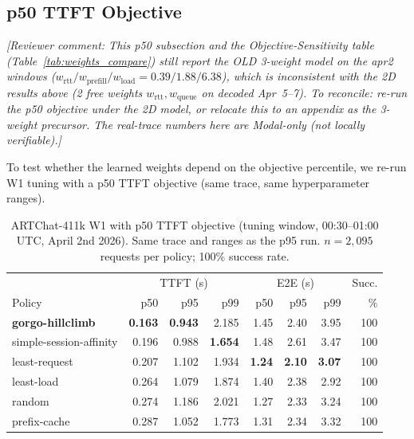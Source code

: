 \documentclass{article}
\newcommand{\cmt}[1]{\textcolor{green!45!black}{\textit{[Reviewer comment: #1]}}}
\begin{document}
\subsection{p50 TTFT Objective}
\label{sec:results:p50}

\cmt{This p50 subsection and the Objective-Sensitivity table
(Table~\ref{tab:weights_compare}) still report the OLD 3-weight model on the apr2
windows ($w_{\mathrm{rtt}}/w_{\mathrm{prefill}}/w_{\mathrm{load}}=0.39/1.88/6.38$),
which is inconsistent with the 2D results above (2 free weights
$w_{\mathrm{rtt}},w_{\mathrm{queue}}$ on decoded Apr~5--7). To reconcile: re-run
the p50 objective under the 2D model, or relocate this to an appendix as the
3-weight precursor. The real-trace numbers here are Modal-only (not locally
verifiable).}

To test whether the learned weights depend on the objective percentile, we
re-run W1 tuning with a p50 TTFT objective (same trace, same hyperparameter
ranges).

\begin{table}[t]
\centering
\small
\caption{ARTChat-411k W1 with p50 TTFT objective (tuning window, 00:30--01:00 UTC,
  April 2nd 2026). Same trace and ranges as the p95 run.
  $n{=}2{,}095$ requests per policy; 100\% success rate.}
\label{tab:w1_p50}
\begin{tabular}{lrrr|rrr|r}
\toprule
 & \multicolumn{3}{c|}{TTFT (s)} & \multicolumn{3}{c|}{E2E (s)} & Succ. \\
Policy & p50 & p95 & p99 & p50 & p95 & p99 & \% \\
\midrule
\textbf{gorgo-hillclimb} & \textbf{0.163} & \textbf{0.943} & 2.185 & 1.45 & 2.40 & 3.95 & 100 \\
simple-session-affinity   & 0.196          & 0.988          & \textbf{1.654} & 1.48 & 2.61 & 3.47 & 100 \\
least-request             & 0.207          & 1.102          & 1.934 & \textbf{1.24} & \textbf{2.10} & \textbf{3.07} & 100 \\
least-load                & 0.264          & 1.079          & 1.874 & 1.40 & 2.38 & 2.92 & 100 \\
random                    & 0.274          & 1.186          & 2.021 & 1.27 & 2.33 & 3.24 & 100 \\
prefix-cache              & 0.287          & 1.052          & 1.773 & 1.31 & 2.34 & 3.32 & 100 \\
\bottomrule
\end{tabular}
\end{table}
\end{document}

